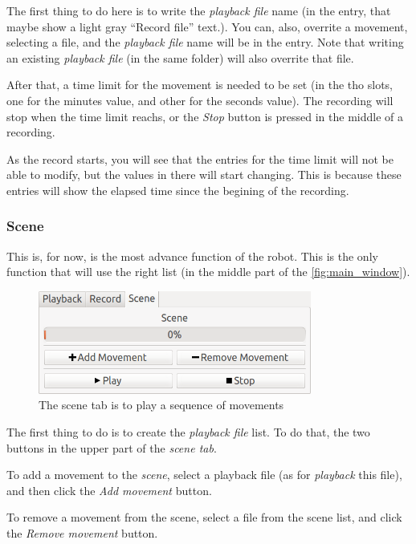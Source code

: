 \documentclass[oneside,a4paper,titlepage]{article}
\begin{document}
	The first thing to do here is to write the \emph{playback file} name (in the entry, that maybe show a light gray ``Record file'' text.). You can, also, overrite a movement, selecting a file, and the \emph{playback file} name will be in the entry. Note that writing an existing \emph{playback file} (in the same folder) will also overrite that file.
	
	After that, a time limit for the movement is needed to be set (in the tho slots, one for the minutes value, and other for the seconds value). The recording will stop when the time limit reachs, or the \emph{Stop} button is pressed in the middle of a recording.
	
	As the record starts, you will see that the entries for the time limit will not be able to modify, but the values in there will start changing. This is because these entries will show the elapsed time since the begining of the recording.
	
\subsubsection{Scene}
\label{subsec:scene}
	This is, for now, is the most advance function of the robot. This is the only function that will use the right list (in the middle part of the \ref{fig:main_window}).

	\begin{figure}[ht!]
		\centering
		\includegraphics[width=0.8\textwidth]{scene_tab}
		\caption[Scene Tab]{The scene tab is to play a sequence of movements}
		\label{fig:scene_tab}
	\end{figure}
	
	The first thing to do is to create the \emph{playback file} list. To do that, the two buttons in the upper part of the \emph{scene tab}.
	
	To add a movement to the \emph{scene}, select a playback file (as for \emph{playback} this file), and then click the \emph{Add movement} button.
	
	To remove a movement from the scene, select a file from the scene list, and click the \emph{Remove movement} button.
	
\end{document}
